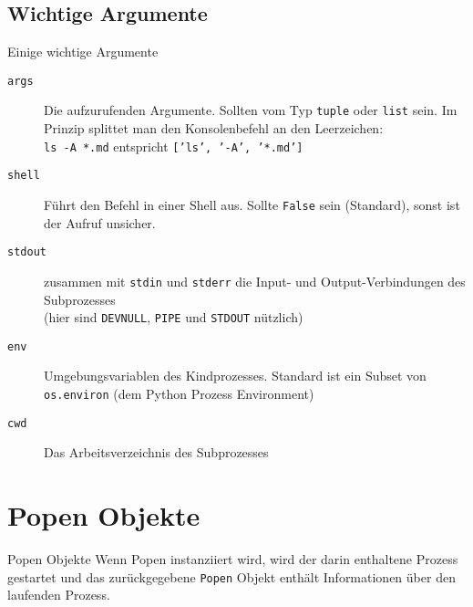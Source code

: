 \subsection{Wichtige Argumente}
\begin{frame}[fragile]{Einige wichtige Argumente}
	\begin{description}
		\item[\texttt{args}] Die aufzurufenden Argumente. Sollten vom Typ
			\texttt{tuple} oder \texttt{list} sein. Im Prinzip splittet man den
			Konsolenbefehl an den Leerzeichen: \\
			\texttt{ls -A *.md} entspricht \texttt{['ls', '-A', '*.md']}
		\item[\texttt{shell}] F\"uhrt den Befehl in einer Shell aus.
			Sollte \texttt{False} sein (Standard), sonst ist der Aufruf unsicher.
		\item[\texttt{stdout}] zusammen mit \texttt{stdin} und \texttt{stderr} die Input- und
			Output-Verbindungen des Subprozesses \\
			(hier sind \texttt{DEVNULL}, \texttt{PIPE} und \texttt{STDOUT} n\"utzlich)
		\item[\texttt{env}] Umgebungsvariablen des Kindprozesses. Standard ist ein
			Subset von \texttt{os.environ} (dem Python Prozess Environment)
		\item[\texttt{cwd}] Das Arbeitsverzeichnis des Subprozesses
	\end{description}
\end{frame}


\section{Popen Objekte}
\begin{frame}{Popen Objekte}
	Wenn Popen instanziiert wird, wird der darin enthaltene Prozess gestartet und
	das zur\"uckgegebene \texttt{Popen} Objekt enth\"alt Informationen \"uber den
	laufenden Prozess.
\end{frame}

